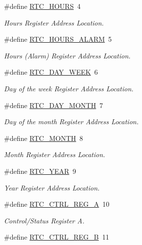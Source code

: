 \begin{DoxyCompactItemize}
\#define \hyperlink{group__RTC_ga4d74cdb9a956c4f1783ad5aff00dc2b8}{R\+T\+C\+\_\+\+H\+O\+U\+RS}~4
\begin{DoxyCompactList}\small\item\em Hours Register Address Location. \end{DoxyCompactList}\item 
\#define \hyperlink{group__RTC_ga736eabe8fe923b38d85437697f37ba35}{R\+T\+C\+\_\+\+H\+O\+U\+R\+S\+\_\+\+A\+L\+A\+RM}~5
\begin{DoxyCompactList}\small\item\em Hours (Alarm) Register Address Location. \end{DoxyCompactList}\item 
\#define \hyperlink{group__RTC_ga5b232f7d613eb3e959f571cc1fa9609e}{R\+T\+C\+\_\+\+D\+A\+Y\+\_\+\+W\+E\+EK}~6
\begin{DoxyCompactList}\small\item\em Day of the week Register Address Location. \end{DoxyCompactList}\item 
\#define \hyperlink{group__RTC_ga46fee80fd77bfe75bc9b6945e8676de8}{R\+T\+C\+\_\+\+D\+A\+Y\+\_\+\+M\+O\+N\+TH}~7
\begin{DoxyCompactList}\small\item\em Day of the month Register Address Location. \end{DoxyCompactList}\item 
\#define \hyperlink{group__RTC_gabda0c877ee1a02b8351c0cfe72838088}{R\+T\+C\+\_\+\+M\+O\+N\+TH}~8
\begin{DoxyCompactList}\small\item\em Month Register Address Location. \end{DoxyCompactList}\item 
\#define \hyperlink{group__RTC_ga1df5568e6774b73aa4c6e59fc40e9147}{R\+T\+C\+\_\+\+Y\+E\+AR}~9
\begin{DoxyCompactList}\small\item\em Year Register Address Location. \end{DoxyCompactList}\item 
\#define \hyperlink{group__RTC_ga31d4952b517473322cb90b9f50186473}{R\+T\+C\+\_\+\+C\+T\+R\+L\+\_\+\+R\+E\+G\+\_\+A}~10
\begin{DoxyCompactList}\small\item\em Control/\+Status Register A. \end{DoxyCompactList}\item 
\#define \hyperlink{group__RTC_gac4dbbdac59ed84b63dd47fca36752a46}{R\+T\+C\+\_\+\+C\+T\+R\+L\+\_\+\+R\+E\+G\+\_\+B}~11

\end{DoxyCompactItemize}
